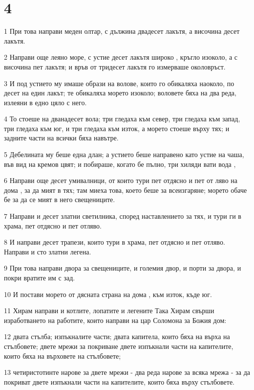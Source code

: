 \chapter{4}

\par 1 При това направи меден олтар, с дължина двадесет лакътя, а височина десет лакътя.
\par 2 Направи още леяно море, с устие десет лакътя широко , кръгло изоколо, а с височина пет лакътя; и връв от тридесет лакътя го измерваше околовръст.
\par 3 И под устието му имаше образи на волове, които го обикаляха наоколо, по десет на един лакът; те обикаляха морето изоколо; воловете бяха на два реда, излеяни в едно цяло с него.
\par 4 То стоеше на дванадесет вола; три гледаха към север, три гледаха към запад, три гледаха към юг, и три гледаха към изток, а морето стоеше върху тях; и задните части на всички бяха навътре.
\par 5 Дебелината му беше една длан; а устието беше направено като устие на чаша, във вид на кремов цвят; и побираше, когато бе пълно, три хиляди вати вода ,
\par 6 Направи още десет умивалници, от които тури пет отдясно и пет от ляво на дома , за да мият в тях; там миеха това, което беше за всеизгаряне; морето обаче бе за да се мият в него свещениците.
\par 7 Направи и десет златни светилника, според наставлението за тях, и тури ги в храма, пет отдясно и пет отляво.
\par 8 И направи десет трапези, които тури в храма, пет отдясно и пет отляво. Направи и сто златни легена.
\par 9 При това направи двора за свещениците, и големия двор, и порти за двора, и покри вратите им с зад.
\par 10 И постави морето от дясната страна на дома , към изток, къде юг.
\par 11 Хирам направи и котлите, лопатите и легените Така Хирам свърши изработването на работите, които направи на цар Соломона за Божия дом:
\par 12 двата стълба; изпъкналите части; двата капитела, които бяха на върха на стълбовете; двете мрежи за покриване двете изпъкнали части на капителите, които бяха на върховете на стълбовете;
\par 13 четиристотинте нарове за двете мрежи - два реда нарове за всяка мрежа - за да покриват двете изпъкнали части на капителите, които бяха върху стълбовете.
